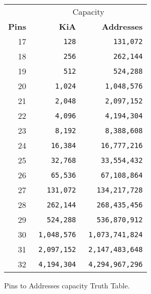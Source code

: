 \begin{figure}[H]
\begin{minipage}[t]{0.49\linewidth}
{\begin{tabular}{rrr}
  & \multicolumn{2}{c}{Capacity} \\
  \cmidrule(lr){2-3}
  
 
 \textbf{Pins} & \textbf{KiA} & \textbf{Addresses}\\               
            
  \toprule    
17   &    \texttt{128}           &      \texttt{131,072} \\
18  &    \texttt{ 256}           &      \texttt{ 262,144} \\
19   &    \texttt{512}           &\texttt{524,288}    \\
20           &\texttt{1,024}            &      \texttt{1,048,576} \\
21           &    \texttt{2,048} &\texttt{2,097,152}    \\
22           &    \texttt{4,096} &\texttt{4,194,304}    \\
23            &    \texttt{8,192} &      \texttt{8,388,608} \\
24           &    \texttt{16,384} &\texttt{16,777,216}    \\
25           &    \texttt{32,768} &      \texttt{33,554,432} \\
26            &\texttt{65,536}            &\texttt{67,108,864}    \\
27           &\texttt{131,072}            &\texttt{134,217,728}    \\
28           &    \texttt{262,144} &\texttt{268,435,456}    \\
29          &    \texttt{524,288} &\texttt{536,870,912}    \\
30          &    \texttt{1,048,576} &      \texttt{1,073,741,824} \\
31          &    \texttt{2,097,152} &      \texttt{2,147,483,648} \\
32          &    \texttt{ 4,194,304} &      \texttt{ 4,294,967,296} \\
  \toprule    
\end{tabular}%
}
\end{minipage}
\caption*{Pins to Addresses capacity Truth Table.}
\end{figure}

